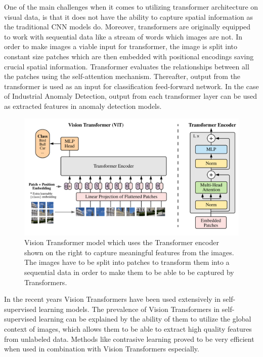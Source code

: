 One of the main challenges when it comes to utilizing transformer architecture on visual data, is that it does not have the ability to capture spatial information as the traditional CNN models do. Moreover, transformers are originally equipped to work with sequential data like a stream of words which images are not. In order to make images a viable input for transformer, the image is split into constant size patches which are then embedded with positional encodings saving crucial spatial information. Transformer evaluates the relationships between all the patches using the self-attention mechanism. Thereafter, output from the transformer is used as an input for classification feed-forward network. In the case of Industrial Anomaly Detection, output from each transformer layer can be used as extracted features in anomaly detection models.

\begin{figure}[t]
	\begin{center}
		\includegraphics[width=1.0\linewidth]{Chapter_2/vit.png}
	\end{center}
	\caption{Vision Transformer model which uses the Transformer encoder shown on the right to capture meaningful features from the images. The images have to be split into patches to transform them into a sequential data in order to make them to be able to be captured by Transformers.}
	\label{fig:vit}
\end{figure}

In the recent years Vision Transformers have been used extensively in self-supervised learning models. The prevalence of Vision Transformers in self-supervised learning can be explained by the ability of them to utilize the global context of images, which allows them to be able to extract high quality features from unlabeled data. Methods like contrasive learning proved to be very efficient when used in combination with Vision Transformers especially.

